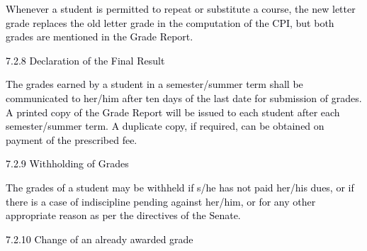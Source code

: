 \documentclass[12pt]{article}
\begin{document}
\vspace{\baselineskip}
\begin{adjustwidth}{0.0in}{0.21in}
{\fontsize{10pt}{12.0pt}\selectfont \textcolor[HTML]{00000A}{Whenever a student is permitted to repeat or substitute a course, the new letter grade replaces the old letter grade in the computation of the CPI, but both grades are mentioned in the Grade Report.}\par}\par

\end{adjustwidth}


\vspace{\baselineskip}
{\fontsize{10pt}{12.0pt}\selectfont \textcolor[HTML]{00000A}{7.2.8 Declaration of the Final Result}\par}\par


\vspace{\baselineskip}
\begin{justify}
{\fontsize{10pt}{12.0pt}\selectfont \textcolor[HTML]{00000A}{The grades earned by a student in a semester/summer term shall be communicated to her/him after ten days of the last date for submission of grades. A printed copy of the Grade Report will be issued to each student after each semester/summer term. A duplicate copy, if required, can be obtained on payment of the prescribed fee.}\par}
\end{justify}\par


\vspace{\baselineskip}
{\fontsize{10pt}{12.0pt}\selectfont \textcolor[HTML]{00000A}{7.2.9 Withholding of Grades}\par}\par


\vspace{\baselineskip}
\begin{adjustwidth}{0.0in}{0.1in}
{\fontsize{10pt}{12.0pt}\selectfont \textcolor[HTML]{00000A}{The grades of a student may be withheld if s/he has not paid her/his dues, or if there is a case of indiscipline pending against her/him, or for any other appropriate reason as per the directives of the Senate.}\par}\par

\end{adjustwidth}


\vspace{\baselineskip}
{\fontsize{10pt}{12.0pt}\selectfont \textcolor[HTML]{00000A}{7.2.10 Change of an already awarded grade}\par}\par
\end{document}

